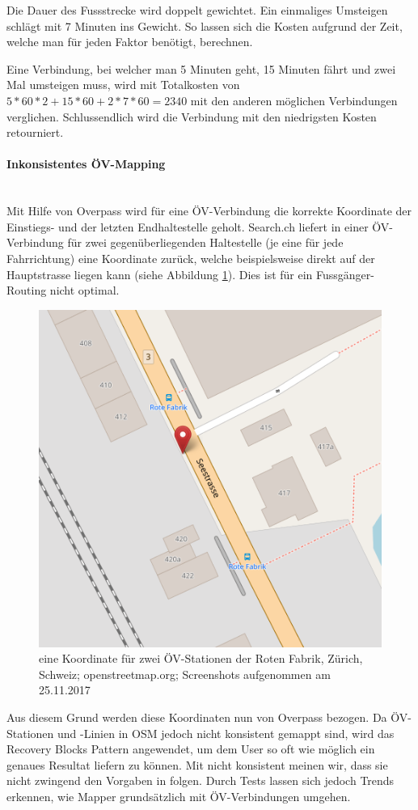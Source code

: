 Die Dauer des Fussstrecke wird doppelt gewichtet. Ein einmaliges Umsteigen schlägt mit 7 Minuten ins Gewicht. So lassen sich die Kosten aufgrund der Zeit, welche man für jeden Faktor benötigt, berechnen.

Eine Verbindung, bei welcher man 5 Minuten geht, 15 Minuten fährt und zwei Mal umsteigen muss, wird mit Totalkosten von $5 * 60 * 2 + 15 * 60 + 2 * 7 * 60 = 2340$ mit den anderen möglichen Verbindungen verglichen. Schlussendlich wird die Verbindung mit den niedrigsten Kosten retourniert.

\paragraph{Inkonsistentes ÖV-Mapping}\label{impl:Plaza Routing inkonsistentes ÖV-Mapping}~\\
Mit Hilfe von Overpass \cite{wiki:overpass} wird für eine ÖV-Verbindung die korrekte Koordinate der Einstiegs- und der letzten Endhaltestelle geholt. Search.ch \cite{search_ch_route_api} liefert in einer ÖV-Verbindung für zwei gegenüberliegenden Haltestelle (je eine für jede Fahrrichtung) eine Koordinate zurück, welche beispielsweise direkt auf der Hauptstrasse liegen kann (siehe Abbildung \ref{fig:one_coordinate_for_two_stops}). Dies ist für ein Fussgänger-Routing nicht optimal.

\begin{figure}[ht]
\centering
\includegraphics[width=0.5\linewidth]{projectdoc/img/one_coordinate_for_two_stops}
\caption[eine Koordinate für zwei ÖV-Stationen]{eine Koordinate für zwei ÖV-Stationen der Roten Fabrik, Zürich, Schweiz; openstreetmap.org; Screenshots aufgenommen am 25.11.2017}
\label{fig:one_coordinate_for_two_stops}
\end{figure}


Aus diesem Grund werden diese Koordinaten nun von Overpass \cite{wiki:overpass} bezogen. 
Da ÖV-Stationen und -Linien in \ac{OSM} jedoch nicht konsistent gemappt sind, wird das Recovery Blocks Pattern \cite{fault_tolerant_software} angewendet, um dem User so oft wie möglich ein genaues Resultat liefern zu können. Mit nicht konsistent meinen wir, dass sie nicht zwingend den Vorgaben in \cite{osm_wiki_relation} folgen. Durch Tests lassen sich jedoch Trends erkennen, wie Mapper grundsätzlich mit ÖV-Verbindungen umgehen.

